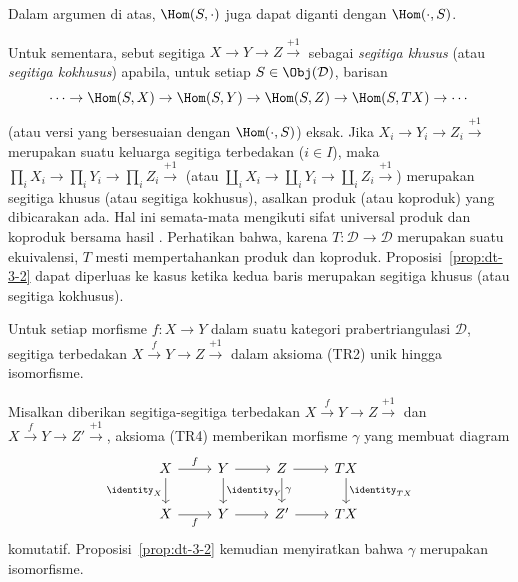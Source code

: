 Dalam argumen di atas, $\Hom(S, \cdot)$ juga dapat diganti dengan
$\Hom(\cdot, S)$.

\begin{catatan}\label{rem:special-triangles}
	Untuk sementara, sebut segitiga $X \to Y \to Z \xrightarrow{+1}$ sebagai
	\emph{segitiga khusus} (atau \emph{segitiga kokhusus}) apabila, untuk setiap
	$S \in \Obj(\mathcal{D})$, barisan
	\[ \cdots \to \Hom(S, X) \to \Hom(S, Y) \to \Hom(S, Z) \to \Hom(S, TX) \to \cdots \]
	(atau versi yang bersesuaian dengan $\Hom(\cdot, S)$) eksak. Jika
	$X_i \to Y_i \to Z_i \xrightarrow{+1}$ merupakan suatu keluarga segitiga
	terbedakan ($i \in I$), maka
	$\prod_i X_i \to \prod_i Y_i \to \prod_i Z_i \xrightarrow{+1}$ (atau
	$\coprod_i X_i \to \coprod_i Y_i \to \coprod_i Z_i \xrightarrow{+1}$)
	merupakan segitiga khusus (atau segitiga kokhusus), asalkan produk (atau
	koproduk) yang dibicarakan ada. Hal ini semata-mata mengikuti sifat universal
	produk dan koproduk bersama hasil \cite[Lema~6.8.3]{Li1}. Perhatikan bahwa,
	karena $T: \mathcal{D} \to \mathcal{D}$ merupakan suatu ekuivalensi, $T$
	mesti mempertahankan produk dan koproduk. Proposisi~\ref{prop:dt-3-2} dapat
	diperluas ke kasus ketika kedua baris merupakan segitiga khusus (atau
	segitiga kokhusus).
\end{catatan}

\begin{korolari}\label{prop:Cone-uniqueness}
	Untuk setiap morfisme $f: X \to Y$ dalam suatu kategori prabertriangulasi
	$\mathcal{D}$, segitiga terbedakan
	$X \xrightarrow{f} Y \to Z \xrightarrow{+1}$ dalam aksioma (TR2) unik
	hingga isomorfisme.
\end{korolari}

\begin{bukti}
	Misalkan diberikan segitiga-segitiga terbedakan
	$X \xrightarrow{f} Y \to Z \xrightarrow{+1}$ dan
	$X \xrightarrow{f} Y \to Z' \xrightarrow{+1}$, aksioma (TR4) memberikan
	morfisme $\gamma$ yang membuat diagram
	\[\begin{tikzcd}
		X \arrow[r, "f"] \arrow[d, "\identity_X"'] & Y \arrow[r] \arrow[d, "\identity_Y"] & Z \arrow[r] \arrow[d, "\gamma"] & TX \arrow[d, "\identity_{TX}"] \\
		X \arrow[r, "f"'] & Y \arrow[r] & Z' \arrow[r] & T X
	\end{tikzcd}\]
	komutatif. Proposisi~\ref{prop:dt-3-2} kemudian menyiratkan bahwa $\gamma$
	merupakan isomorfisme.
\end{bukti}

